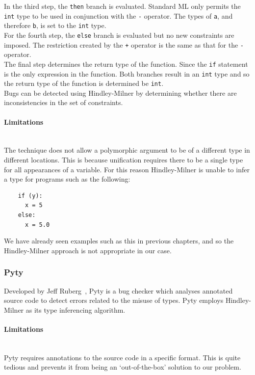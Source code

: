 \documentclass[12pt, titlepage]{article}
\begin{document}
\indent In the third step, the \texttt{then} branch is evaluated. Standard ML only permits the \texttt{int} type to be used in conjunction with the \texttt{-} operator. The types of \texttt{a}, and therefore \texttt{b}, is set to the \texttt{int} type. \\
\indent For the fourth step, the \texttt{else} branch is evaluated but no new constraints are imposed. The restriction created by the \texttt{+} operator is the same as that for the \texttt{-} operator. \\
\indent The final step determines the return type of the function. Since the \texttt{if} statement is the only expression in the function. Both branches result in an \texttt{int} type and so the return type of the function is determined be \texttt{int}. \\
\indent Bugs can be detected using Hindley-Milner by determining whether there are inconsistencies in the set of constraints.

\paragraph{Limitations}\mbox{}\\
The technique does not allow a polymorphic argument to be of a different type in different locations. This is because unification requires there to be a single type for all appearances of a variable. For this reason Hindley-Milner is unable to infer a type for programs such as the following:
\begin{lstlisting}
	if (y):	
	  x = 5     
	else:
	  x = 5.0   
\end{lstlisting}
We have already seen examples such as this in previous chapters, and so the Hindley-Milner approach is not appropriate in our case.

\subsubsection{Pyty}
Developed by Jeff Ruberg~\cite{pyty}, Pyty is a bug checker which analyses annotated source code to detect errors related to the misuse of types. Pyty employs Hindley-Milner as its type inferencing algorithm.
\paragraph{Limitations}\mbox{}\\
Pyty requires annotations to the source code in a specific format. This is quite tedious and prevents it from being an `out-of-the-box' solution to our problem.
\end{document}
